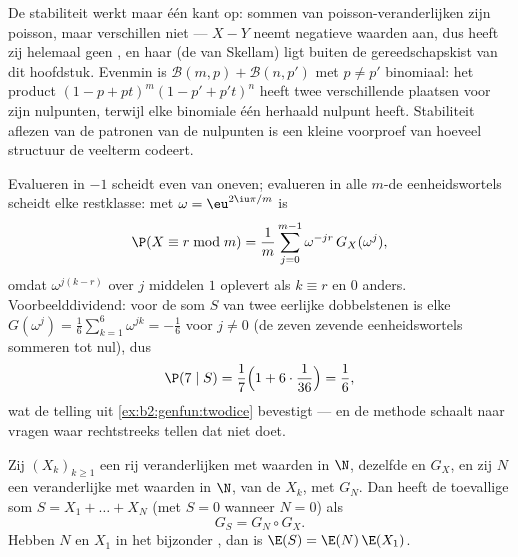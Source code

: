 \begin{remark}
De stabiliteit werkt maar één kant op: sommen van 
poisson-veranderlijken zijn poisson, maar verschillen niet --- $X -
Y$ neemt negatieve waarden aan, dus heeft zij helemaal geen
, en haar  (de  van Skellam)
ligt buiten de gereedschapskist van dit hoofdstuk. Evenmin is
$\mathcal B(m, p) + \mathcal B(n, p')$ met $p \neq p'$ binomiaal:
het product $(1 - p + pt)^m(1 - p' + p't)^n$ heeft twee
verschillende plaatsen voor zijn nulpunten, terwijl elke binomiale
 één herhaald nulpunt heeft. Stabiliteit aflezen
van de patronen van de nulpunten is een kleine voorproef van
hoeveel structuur de veelterm codeert.
\end{remark}

\begin{remark}
Evalueren in $-1$ scheidt even van oneven; evalueren in alle
$m$-de eenheidswortels scheidt elke restklasse: met $\omega =
\eu^{2\iu\pi/m}$ is
\[
\P(X \equiv r \bmod m)
= \frac1m\sum_{j=0}^{m-1}\omega^{-jr}\,G_X(\omega^j),
\]
omdat $\omega^{j(k-r)}$ over $j$ middelen $1$ oplevert als $k
\equiv r$ en $0$ anders. Voorbeelddividend: voor de som $S$ van
twee eerlijke dobbelstenen is elke $G(\omega^j) =
\frac16\sum_{k=1}^6 \omega^{jk} = -\frac16$ voor $j \neq 0$ (de
zeven zevende eenheidswortels sommeren tot nul), dus
\[
\P(7 \mid S) = \frac17\Bigl(1 +
6\cdot\frac1{36}\Bigr) = \frac16 ,
\]
wat de telling uit \cref{ex:b2:genfun:twodice} bevestigt --- en de
methode schaalt naar vragen waar rechtstreeks tellen dat niet doet.
\end{remark}

\begin{theorem}\label{thm:b2:genfun:compound}
Zij $(X_k)_{k\geq1}$ een rij  veranderlijken met
waarden in $\N$, dezelfde  en  $G_X$,
en zij $N$ een veranderlijke met waarden in $\N$,  van
de $X_k$, met  $G_N$. Dan heeft de toevallige
som $S = X_1 + \dots + X_N$ (met $S = 0$ wanneer $N = 0$) als
\[
G_S = G_N \circ G_X .
\]
Hebben $N$ en $X_1$ in het bijzonder , dan is
$\E(S) = \E(N)\,\E(X_1)$.
\end{theorem}

